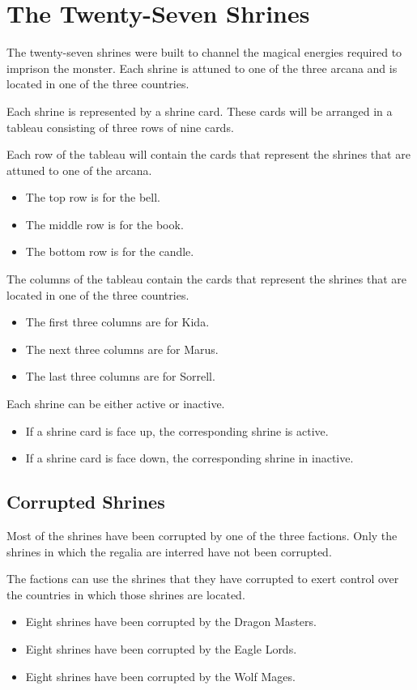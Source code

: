 \documentclass[10pt, parskip=half-, twoside]{scrartcl}
\begin{document}
\newpage

\section*{The Twenty-Seven Shrines}
The twenty-seven shrines were built to channel the magical energies required to imprison the monster. Each shrine is attuned to one of the three arcana and is located in one of the three countries.

Each shrine is represented by a shrine card. These cards will be arranged in a tableau consisting of three rows of nine cards.

Each row of the tableau will contain the cards that represent the shrines that are attuned to one of the arcana.
\begin{itemize}
\item The top row is for the bell.
\item The middle row is for the book.
\item The bottom row is for the candle.
\end{itemize}

\newpage

The columns of the tableau contain the cards that represent the shrines that are located in one of the three countries.
\begin{itemize}
\item The first three columns are for Kida.
\item The next three columns are for Marus.
\item The last three columns are for Sorrell.
\end{itemize}
Each shrine can be either active or inactive.
\begin{itemize}
\item If a shrine card is face up, the corresponding shrine is active.
\item If a shrine card is face down, the corresponding shrine in inactive.
\end{itemize}

\newpage

\subsection*{Corrupted Shrines}
Most of the shrines have been corrupted by one of the three factions. Only the shrines in which the regalia are interred have not been corrupted.

The factions can use the shrines that they have corrupted to exert control over the countries in which those shrines are located.
\begin{itemize}
\item Eight shrines have been corrupted by the Dragon Masters.
\item Eight shrines have been corrupted by the Eagle Lords.
\item Eight shrines have been corrupted by the Wolf Mages.
\end{itemize}
\end{document}
